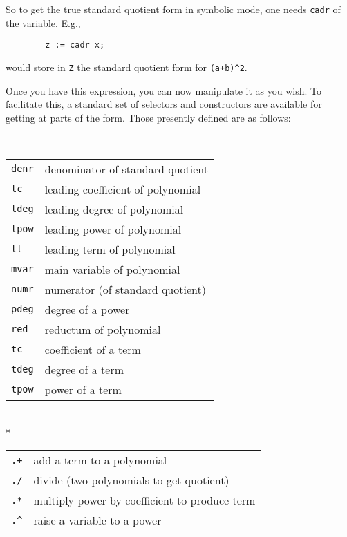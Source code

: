 So to get the true standard quotient form in symbolic mode, one needs
\texttt{cadr} of the variable. E.g.,
\begin{verbatim}
        z := cadr x;
\end{verbatim}
would store in \texttt{Z} the standard quotient form for 
\texttt{(a+b)\textasciicircum 2}.

Once you have this expression, you can now manipulate it as you wish.  To
facilitate this, a standard set of selectors and
constructors are available for getting at parts of the
form.  Those presently defined are as follows:
\begin{description}
\renewcommand{\arraystretch}{1.5}

\item[REDUCE Selectors]\mbox{}\\[-2mm]
%
\begin{tabular}{lp{\rboxwidth}}
%
\texttt{denr} & denominator of standard quotient \\
%
\texttt{lc} & leading coefficient of polynomial \\
%
\texttt{ldeg} & leading degree of polynomial \\
%
\texttt{lpow} & leading power of polynomial \\
%
\texttt{lt} & leading term of polynomial \\
%
\texttt{mvar} & main variable of polynomial \\
%
\texttt{numr} & numerator (of standard quotient) \\
%
\texttt{pdeg} & degree of a power \\
%
\texttt{red} & reductum of polynomial \\
%
\texttt{tc} & coefficient of a term \\
%
\texttt{tdeg} & degree of a term \\
%
\texttt{tpow} & power of a term
\end{tabular}

\pagebreak
\item[REDUCE Constructors]\mbox{}\\*
%
\begin{tabular}{lp{\redboxwidth}}
\texttt{.+} & add a term to a polynomial \\
%
\texttt{./} & divide (two polynomials to get quotient) \\
\texttt{.*} & multiply power by coefficient to produce term \\
%
\texttt{.\textasciicircum} & raise a variable to a power
\end{tabular}
\end{description}

